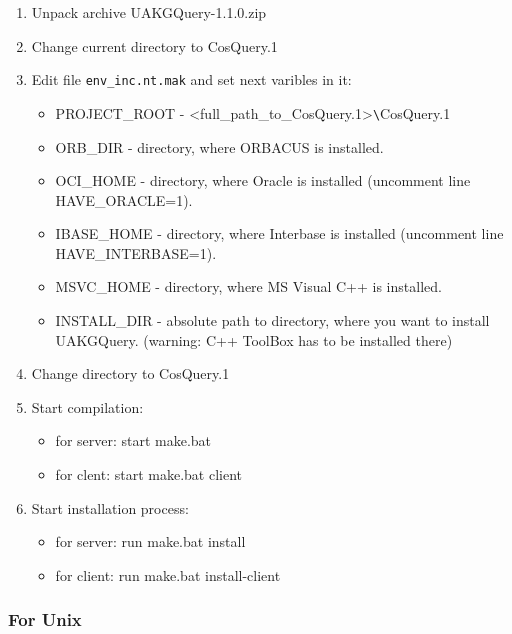 \documentclass[10pt]{article}
\begin{document}
\begin{enumerate}
 \item Unpack archive UAKGQuery-1.1.0.zip
 \item Change current directory to CosQuery.1
 \item Edit file \verb|env_inc.nt.mak| and set next varibles in it: 
      \begin{itemize}
        \item  PROJECT\_ROOT - <full\_path\_to\_CosQuery.1>\verb|\|CosQuery.1
        \item  ORB\_DIR - directory, where ORBACUS is installed.
        \item  OCI\_HOME - directory, where Oracle is installed (uncomment line HAVE\_ORACLE=1).
        \item  IBASE\_HOME - directory, where Interbase is installed (uncomment line HAVE\_INTERBASE=1).
        \item  MSVC\_HOME - directory, where MS Visual C++ is installed.
        \item  INSTALL\_DIR - absolute path to directory, where you want to install UAKGQuery. (warning: C++ ToolBox has to be installed there)
      \end{itemize}
 \item Change directory to CosQuery.1 
 \item Start compilation:
   \begin{itemize}
     \item for server: start make.bat 
     \item for clent: start make.bat client
   \end{itemize}
 \item Start installation process:
   \begin{itemize}
     \item for server: run make.bat install
     \item for client: run make.bat install-client
   \end{itemize}
\end{enumerate}

\subsubsection{ For Unix }
\end{document}
